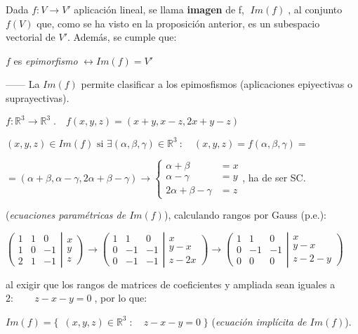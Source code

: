 \begin{defi}
Dada $f:V\to V'$ aplicación lineal, se llama \textbf{imagen} de f, $\;Im(f)\;$, al conjunto $f(V)$ que, como se ha visto en la proposición anterior, es un subespacio vectorial de $V'$. Además, se cumple que: 

$f$ es \emph{epimorfismo} $\leftrightarrow Im(f)=V'$	 

------ La $Im(f)$ permite clasificar a los epimosfismos (aplicaciones epiyectivas o suprayectivas).
\end{defi}

\begin{ejem}
$f:\mathbb R^3 \to \mathbb R^3\;.\quad f(x,y,z)=(x+y,x-z,2x+y-z)$

\noindent $(x,y,z)\in Im(f) \text{ si } \exists (\alpha, \beta, \gamma)\in\mathbb R^3 \: : \quad (x,y,z)=f(\alpha, \beta, \gamma)=$

\noindent $=(\alpha+\beta, \alpha -\gamma, 2\alpha+\beta-\gamma)  \to \begin{cases} \alpha+\beta&=x\\ \alpha -\gamma&=y\\ 2\alpha+\beta-\gamma&=z \end{cases}$, ha de ser SC.

\noindent \textcolor{gris}{(\emph{ecuaciones paramétricas de $Im(f)$})}, calculando rangos por Gauss (p.e.):

\noindent \small{$\left( \begin{matrix} 1&1&0\\1&0&-1\\2&1&-1 \end{matrix} \right| \left. \begin{matrix} x\\y\\z \end{matrix} \right) \to  \left( \begin{matrix} 1&1&0\\0&-1&-1\\0&-1&-1 \end{matrix} \right| \left. \begin{matrix} x\\y-x\\z-2x \end{matrix} \right) \to \left( \begin{matrix} \boxed{1}&\boxed{1}&0\\\boxed{0}&\boxed{-1}&-1\\0&0&0 \end{matrix} \right| \left. \begin{matrix} x\\y-x\\z-2-y \end{matrix} \right) $}

\noindent \normalsize{al} exigir que los rangos de matrices de coeficientes y ampliada sean iguales a $2:\qquad z-x-y=0\;$, por lo que:

 $Im(f)=\{\;\ (x,y,z)\in \mathbb R^3\; : \quad z-x-y=0 \; \}$ \textcolor{gris}{(\emph{ecuación implícita de $Im(f)$})}.
\end{ejem}

